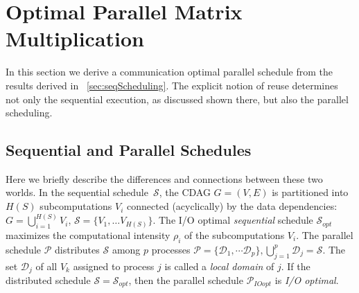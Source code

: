 \documentclass[sigplan,review,anonymous]{acmart}\settopmatter{printfolios=true,printccs=false,printacmref=false}
\newcommand\greg[1]{\textcolor{blue}{[Greg: #1]}}
\newcommand\mac[1]{\textcolor{red}{[Mac: #1]}}
\begin{document}
%
%
%


\section{Optimal Parallel Matrix Multiplication}
\label{sec:parOptimality}

In this section we derive a communication optimal parallel schedule 
from the
results derived in ~\cref{sec:seqScheduling}. The explicit notion of reuse 
determines not only the sequential execution, as
discussed shown there, but also the parallel scheduling.

\subsection{Sequential and Parallel Schedules}
\label{sec:seqpar}

Here we briefly describe the differences and connections between these two 
worlds. In the sequential schedule~$\mathcal{S}$, the CDAG $G = (V,E)$ is 
partitioned into 
$H(S)$ 
subcomputations $V_i$ connected (acyclically) by the data dependencies: $G = 
\bigcup_{i=1}^{H(S)} V_i$, $\mathcal{S} = \{V_1, \dots V_{H(S)}\}$. The I/O 
optimal \emph{sequential} schedule $\mathcal{S}_{opt}$ maximizes the 
computational intensity 
$\rho_i$ of 
the subcomputations $V_i$. The parallel schedule $\mathcal{P}$ distributes 
$\mathcal{S}$ among $p$ processes $\mathcal{P} = \{\mathcal{D}_1, \cdots 
\mathcal{D}_p\}, \bigcup_{j=1}^p \mathcal{D}_j = \mathcal{S}$. The set 
$\mathcal{D}_j$ of all 
$V_k$ assigned to 
process $j$ is called a \emph{local domain} of $j$. If 
the distributed schedule $\mathcal{S} = 
\mathcal{S}_{opt}$, then the parallel schedule $\mathcal{P}_{IOopt}$ is 
\emph{I/O optimal}.
\end{document}

